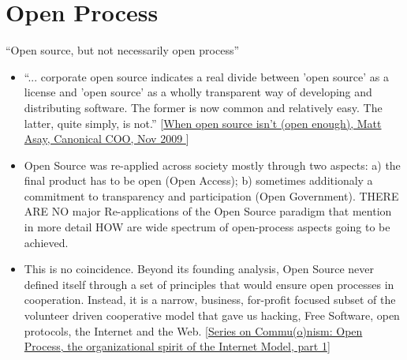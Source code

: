 

\section{Open Process}

\begin{frame}{``Open source, but not necessarily open process''}{}

\begin{itemize}

\item ``... corporate open source indicates a real divide between
  'open source' as a license and 'open source' as a wholly transparent
  way of developing and distributing software. The former is now
  common and relatively easy. The latter, quite simply, is not.''
  \scriptsize
      [\href{http://news.cnet.com/8301-13505_3-10394478-16.html}{When
          open source isn't (open enough), Matt Asay, Canonical COO, Nov 2009 }]

\item Open Source was re-applied across society mostly through two
  aspects: a) the final product has to be open (Open Access); b)
  sometimes additionaly a commitment to transparency and participation
  (Open Government). THERE ARE NO major Re-applications of the Open
  Source paradigm that mention in more detail HOW are wide spectrum of
  open-process aspects going to be achieved.

\item This is no coincidence. Beyond its founding analysis, Open
  Source never defined itself through a set of principles that would
  ensure open processes in cooperation. Instead, it is a narrow,
  business, for-profit focused subset of the volunteer driven
  cooperative model that gave us hacking, Free Software, open
  protocols, the Internet and the Web. \scriptsize
  [\href{http://hackthestate.org/2010/03/05/series-on-commuonism-open-process-the-organizational-spirit-of-the-internet-model-1/}{Series
      on Commu(o)nism: Open Process, the organizational spirit of the
      Internet Model, part 1}]

\end{itemize}
\end{frame}

